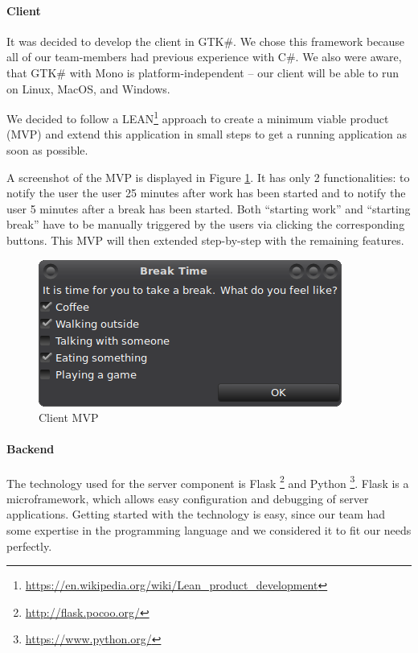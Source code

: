 

\paragraph{Client} It was decided to develop the client in GTK\#. We chose this framework because all of our team-members had previous experience with C\#. We also were aware, that GTK\# with Mono is platform-independent -- our client will be able to run on Linux, MacOS, and Windows.

We decided to follow a LEAN\footnote{\url{https://en.wikipedia.org/wiki/Lean_product_development}} approach to create a minimum viable product (MVP) and extend this application in small steps to get a running application as soon as possible.

A screenshot of the MVP is displayed in Figure \ref{fig:mvp-screenshot}. It has only 2 functionalities: to notify the user the user 25 minutes after work has been started and to notify the user 5 minutes after a break has been started. Both ``starting work'' and ``starting break'' have to be manually triggered by the users via clicking the corresponding buttons. This MVP will then extended step-by-step with the remaining features.


\begin{figure}
  \centering
  \includegraphics{images/mvp-screenshot.png}
  \caption{Client MVP}
  \label{fig:mvp-screenshot}
\end{figure}

\paragraph{Backend}
The technology used for the server component is Flask \footnote{\url{http://flask.pocoo.org/}} and Python \footnote{\url{https://www.python.org/}}. Flask is a microframework, which allows easy configuration and debugging of server applications. Getting started with the technology is easy, since our team had some expertise in the programming language and we considered it to fit our needs perfectly. 

